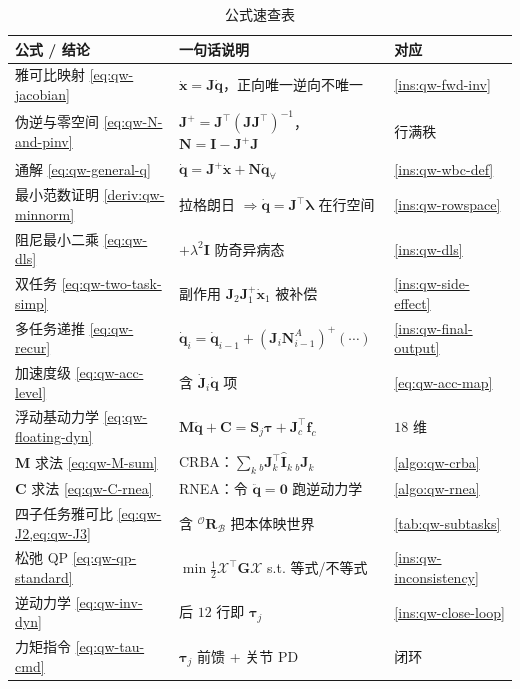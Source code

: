 \begin{table}[H]\centering\small
\caption{公式速查表}
\begin{tabular}{lll}
\toprule
公式 / 结论 & 一句话说明 & 对应 \\
\midrule
雅可比映射 \cref{eq:qw-jacobian} & $\dot{\boldsymbol{x}}=\boldsymbol{J}\dot{\boldsymbol{q}}$，正向唯一逆向不唯一 & \cref{ins:qw-fwd-inv} \\
伪逆与零空间 \cref{eq:qw-N-and-pinv} & $\boldsymbol{J}^+=\boldsymbol{J}^\top(\boldsymbol{J}\boldsymbol{J}^\top)^{-1}$，$\boldsymbol{N}=\mathbf{I}-\boldsymbol{J}^+\boldsymbol{J}$ & 行满秩 \\
通解 \cref{eq:qw-general-q} & $\dot{\boldsymbol{q}}=\boldsymbol{J}^+\dot{\boldsymbol{x}}+\boldsymbol{N}\dot{\boldsymbol{q}}_{\forall}$ & \cref{ins:qw-wbc-def} \\
最小范数证明 \cref{deriv:qw-minnorm} & 拉格朗日 $\Rightarrow\dot{\boldsymbol{q}}=\boldsymbol{J}^\top\boldsymbol{\lambda}$ 在行空间 & \cref{ins:qw-rowspace} \\
阻尼最小二乘 \cref{eq:qw-dls} & $+\lambda^2\mathbf{I}$ 防奇异病态 & \cref{ins:qw-dls} \\
双任务 \cref{eq:qw-two-task-simp} & 副作用 $\boldsymbol{J}_2\boldsymbol{J}_1^+\dot{\boldsymbol{x}}_1$ 被补偿 & \cref{ins:qw-side-effect} \\
多任务递推 \cref{eq:qw-recur} & $\dot{\boldsymbol{q}}_i=\dot{\boldsymbol{q}}_{i-1}+(\boldsymbol{J}_i\boldsymbol{N}_{i-1}^A)^+(\cdots)$ & \cref{ins:qw-final-output} \\
加速度级 \cref{eq:qw-acc-level} & 含 $\dot{\boldsymbol{J}}_i\dot{\boldsymbol{q}}$ 项 & \cref{eq:qw-acc-map} \\
浮动基动力学 \cref{eq:qw-floating-dyn} & $\boldsymbol{M}\ddot{\boldsymbol{q}}+\boldsymbol{C}=\boldsymbol{S}_j\boldsymbol{\tau}+\boldsymbol{J}_c^\top\boldsymbol{f}_c$ & $18$ 维 \\
$\boldsymbol{M}$ 求法 \cref{eq:qw-M-sum} & CRBA：$\sum_k{}_{b}\boldsymbol{J}_k^\top\hat{\mathbf{I}}_k\,{}_{b}\boldsymbol{J}_k$ & \cref{algo:qw-crba} \\
$\boldsymbol{C}$ 求法 \cref{eq:qw-C-rnea} & RNEA：令 $\ddot{\boldsymbol{q}}{=}\mathbf{0}$ 跑逆动力学 & \cref{algo:qw-rnea} \\
四子任务雅可比 \cref{eq:qw-J2,eq:qw-J3} & 含 ${}^{\mathcal{O}}\mathbf{R}_{\mathcal{B}}$ 把本体映世界 & \cref{tab:qw-subtasks} \\
松弛 QP \cref{eq:qw-qp-standard} & $\min\tfrac12\boldsymbol{\mathcal{X}}^\top\boldsymbol{G}\boldsymbol{\mathcal{X}}$ s.t. 等式/不等式 & \cref{ins:qw-inconsistency} \\
逆动力学 \cref{eq:qw-inv-dyn} & 后 $12$ 行即 $\boldsymbol{\tau}_j$ & \cref{ins:qw-close-loop} \\
力矩指令 \cref{eq:qw-tau-cmd} & $\boldsymbol{\tau}_j$ 前馈 + 关节 PD & 闭环 \\
\bottomrule
\end{tabular}
\end{table}

